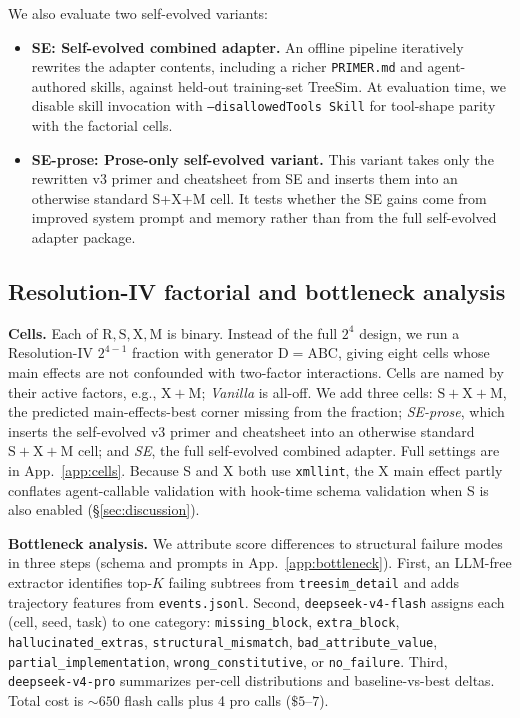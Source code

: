 \documentclass{article}
\begin{document}
We also evaluate two self-evolved variants:

\begin{itemize}
    \item \textbf{SE: Self-evolved combined adapter.} An offline pipeline iteratively rewrites the adapter contents, including a richer \texttt{PRIMER.md} and agent-authored skills, against held-out training-set TreeSim. At evaluation time, we disable skill invocation with \texttt{--disallowedTools Skill} for tool-shape parity with the factorial cells.

    \item \textbf{SE-prose: Prose-only self-evolved variant.} This variant takes only the rewritten v3 primer and cheatsheet from SE and inserts them into an otherwise standard S+X+M cell. It tests whether the SE gains come from improved system prompt and memory rather than from the full self-evolved adapter package.
\end{itemize}

\subsection{Resolution-IV factorial and bottleneck analysis}
\label{subsec:cells}

\textbf{Cells.} Each of $\mathrm{R,S,X,M}$ is binary. Instead of the full $2^4$ design, we run a Resolution-IV $2^{4-1}$ fraction with generator $\mathrm{D}{=}\mathrm{ABC}$, giving eight cells whose main effects are not confounded with two-factor interactions. Cells are named by their active factors, e.g., $\mathrm{X+M}$; \emph{Vanilla} is all-off. We add three cells: $\mathrm{S+X+M}$, the predicted main-effects-best corner missing from the fraction; \emph{SE-prose}, which inserts the self-evolved v3 primer and cheatsheet into an otherwise standard $\mathrm{S+X+M}$ cell; and \emph{SE}, the full self-evolved combined adapter. Full settings are in App.~\ref{app:cells}. Because S and X both use \texttt{xmllint}, the X main effect partly conflates agent-callable validation with hook-time schema validation when S is also enabled (\S\ref{sec:discussion}).

\textbf{Bottleneck analysis.} We attribute score differences to structural failure modes in three steps (schema and prompts in App.~\ref{app:bottleneck}). First, an LLM-free extractor identifies top-$K$ failing subtrees from \texttt{treesim\_detail} and adds trajectory features from \texttt{events.jsonl}. Second, \texttt{deepseek-v4-flash} assigns each (cell, seed, task) to one category: \texttt{missing\_block}, \texttt{extra\_block}, \texttt{hallucinated\_extras}, \texttt{structural\_mismatch}, \texttt{bad\_attribute\_value}, \texttt{partial\_implementation}, \texttt{wrong\_constitutive}, or \texttt{no\_failure}. Third, \texttt{deepseek-v4-pro} summarizes per-cell distributions and baseline-vs-best deltas. Total cost is ${\sim}650$ flash calls plus 4 pro calls ($\$5\text{--}7$).
\end{document}
